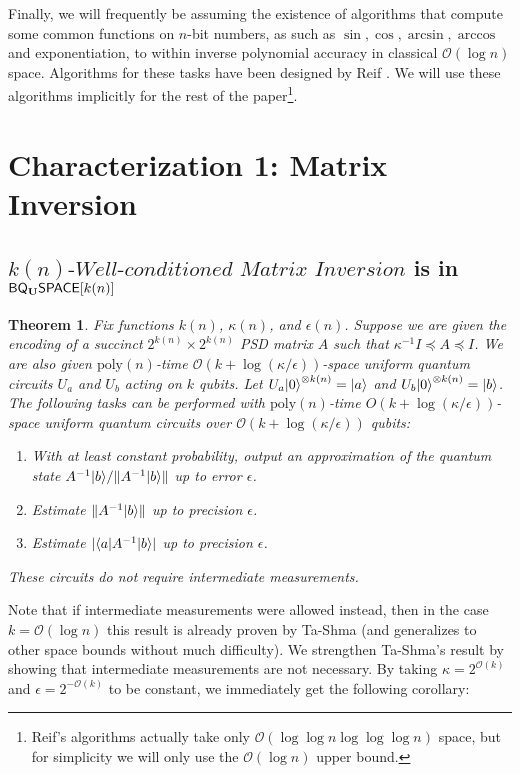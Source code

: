 \documentclass[11pt]{article}
\newtheorem{theorem}{Theorem}
\theoremstyle{definition}
\theoremstyle{remark}
\theoremstyle{definition}
\newcommand\matrixinvert[1]{{\ensuremath{#1}}\textit{-Well-conditioned Matrix Inversion}}
\newcommand{\classfont}{\sf}
\newcommand{\Unitary}{\mathbf{U}}
\newcommand{\unitaryBQSPACE}[1]{{\classfont{BQ}_\Unitary\classfont{SPACE}}[#1]}
\newcommand\bigoh{\mathcal{O}}
\newcommand{\poly}{\textrm{poly}}
\begin{document}
Finally, we will frequently be assuming the existence of  algorithms that compute some common functions on $n$-bit numbers, as such as $\sin,\cos,\arcsin,\arccos$ and exponentiation, to within inverse polynomial accuracy in classical $\bigoh (\log{n})$ space.  Algorithms for these tasks have been designed by Reif \cite{reif}. We will use these algorithms implicitly for the rest of the paper\footnote{Reif's algorithms actually take only $\bigoh (\log\log{n}\log\log\log{n})$ space, but for simplicity we will only use the $\bigoh (\log{n})$ upper bound.}.

\section{Characterization 1: Matrix Inversion}
\subsection{$\matrixinvert{k(n)}$ is in $\unitaryBQSPACE{k(n)}$}
\begin{theorem} \label{thm: matrix inversion alg}
Fix functions $k(n)$, $\kappa(n)$, and $\epsilon(n)$. Suppose we are given the encoding of a succinct $2^{k(n)} \times 2^{k(n)}$ PSD matrix $A$ such that $\kappa^{-1} I \preceq A \preceq I$. We are also given $\poly(n)$-time $\mathcal{O}(k+\log(\kappa/\epsilon))$-space uniform quantum circuits $U_a$ and $U_b$ acting on $k$ qubits. Let $U_a{\left\vert{0}\right\rangle}^{\otimes k(n)} = {\left\vert{a}\right\rangle}$ and $U_b{\left\vert{0}\right\rangle}^{\otimes k(n)} = {\left\vert{b}\right\rangle}$. The following tasks can be performed with $\poly(n)$-time $O(k+\log(\kappa/\epsilon))$-space uniform quantum circuits over $\bigoh (k+\log(\kappa/\epsilon))$ qubits:
\begin{enumerate}
\item With at least constant probability, output an approximation of the quantum state $A^{-1}{\left\vert{b}\right\rangle} / \|A^{-1}{\left\vert{b}\right\rangle}\|$ up to error $\epsilon$.
\item Estimate $\|A^{-1}{\left\vert{b}\right\rangle}\|$ up to precision $\epsilon$.
\item Estimate  $|{\left\langle{a}\right\vert}A^{-1}{\left\vert{b}\right\rangle}|$ up to precision $\epsilon$.
\end{enumerate}
These circuits do not require intermediate measurements.
\end{theorem}
Note that if intermediate measurements were allowed instead, then in the case $k = \mathcal{O}(\log n)$ this result is already proven by Ta-Shma \cite[Theorem~6.3]{tashma} (and generalizes to other space bounds without much difficulty). We strengthen Ta-Shma's result by showing that intermediate measurements are not necessary. By taking $\kappa = 2^{\bigoh (k)}$ and $\epsilon = 2^{-\bigoh (k)}$ to be constant, we immediately get the following corollary: 
\end{document}
